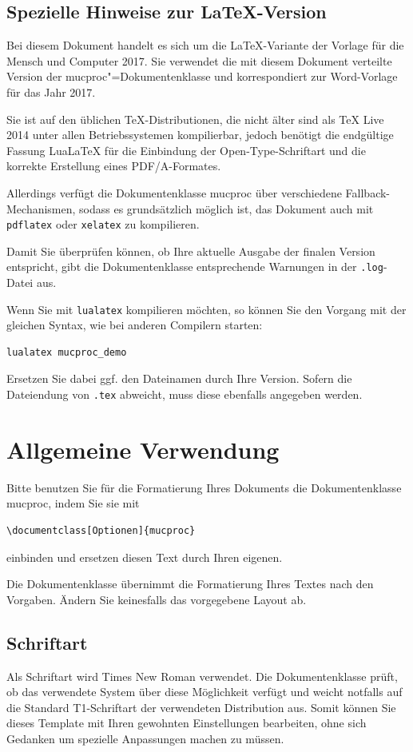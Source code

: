 \documentclass[ngerman,forcefinal
	]{mucproc}
\newenvironment{minted}[2][]{\endgraf\verbatim}{\endverbatim}
\begin{document}
\subsection{Spezielle Hinweise zur \LaTeX-Version}
Bei diesem Dokument handelt es sich um die \LaTeX-Variante der Vorlage für die Mensch und Computer 2017.
Sie verwendet die mit diesem Dokument verteilte Version der \textsf{mucproc}"=Dokumentenklasse \mucprocVersion{} und korrespondiert zur Word-Vorlage für das Jahr 2017.

Sie ist auf den üblichen \TeX-Distributionen, die nicht älter sind als \TeX{} Live 2014
unter allen Betriebssystemen kompilierbar, jedoch benötigt die endgültige Fassung Lua\LaTeX{}
für die Einbindung der Open-Type-Schriftart und die korrekte Erstellung eines PDF/A-Formates.

Allerdings verfügt die Dokumentenklasse \textsf{mucproc} über verschiedene Fallback-Mechanismen, sodass es grundsätzlich möglich ist, das Dokument auch mit \texttt{pdflatex} oder \texttt{xelatex} zu kompilieren.

Damit Sie überprüfen können, ob Ihre aktuelle Ausgabe der finalen Version entspricht, gibt die Dokumentenklasse entsprechende Warnungen in der \texttt{.log}-Datei aus.

Wenn Sie mit \texttt{lualatex} kompilieren möchten, so können Sie den Vorgang mit der gleichen Syntax, wie bei anderen Compilern starten:

\begin{verbatim}
lualatex mucproc_demo
\end{verbatim}
Ersetzen Sie dabei ggf. den Dateinamen durch Ihre Version. Sofern die Dateiendung von \texttt{.tex} abweicht, muss diese ebenfalls angegeben werden.

\section{Allgemeine Verwendung}
Bitte benutzen Sie für die Formatierung Ihres Dokuments die Dokumentenklasse \textsf{mucproc}, indem Sie sie mit
\begin{verbatim}
\documentclass[Optionen]{mucproc}
\end{verbatim}
einbinden und ersetzen diesen Text durch Ihren eigenen.

Die Dokumentenklasse übernimmt die Formatierung Ihres Textes nach den Vorgaben. Ändern Sie keinesfalls das vorgegebene Layout ab.


\subsection{Schriftart}
Als Schriftart wird Times New Roman verwendet. Die Dokumentenklasse prüft, ob das verwendete System über diese Möglichkeit verfügt und weicht notfalls auf die Standard T1-Schriftart der verwendeten Distribution aus. Somit können Sie dieses Template mit Ihren gewohnten Einstellungen bearbeiten, ohne sich Gedanken um spezielle Anpassungen machen zu müssen.
\end{document}

